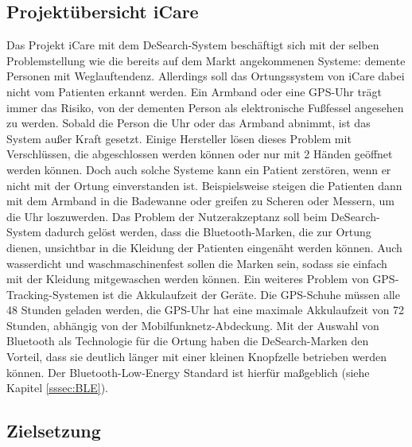 \subsection{Projektübersicht iCare}
Das Projekt iCare mit dem DeSearch-System beschäftigt sich mit der selben Problemstellung wie die bereits auf dem Markt angekommenen Systeme: demente Personen mit Weglauftendenz. Allerdings soll das Ortungssystem von iCare dabei nicht vom Patienten erkannt werden. Ein Armband oder eine GPS-Uhr trägt immer das Risiko, von der dementen Person als elektronische Fußfessel angesehen zu werden. Sobald die Person die Uhr oder das Armband abnimmt, ist das System außer Kraft gesetzt. Einige Hersteller lösen dieses Problem mit Verschlüssen, die abgeschlossen werden können oder nur mit 2 Händen geöffnet werden können. Doch auch solche Systeme kann ein Patient zerstören, wenn er nicht mit der Ortung einverstanden ist. Beispielsweise steigen die Patienten dann mit dem Armband in die Badewanne oder greifen zu Scheren oder Messern, um die Uhr loszuwerden. Das Problem der Nutzerakzeptanz soll beim DeSearch-System dadurch gelöst werden, dass die Bluetooth-Marken, die zur Ortung dienen, unsichtbar in die Kleidung der Patienten eingenäht werden können. Auch wasserdicht und waschmaschinenfest sollen die Marken sein, sodass sie einfach mit der Kleidung mitgewaschen werden können. Ein weiteres Problem von GPS-Tracking-Systemen ist die Akkulaufzeit der Geräte. Die GPS-Schuhe müssen alle 48 Stunden geladen werden, die GPS-Uhr hat eine maximale Akkulaufzeit von 72 Stunden, abhängig von der Mobilfunknetz-Abdeckung. Mit der Auswahl von Bluetooth als Technologie für die Ortung haben die DeSearch-Marken den Vorteil, dass sie deutlich länger mit einer kleinen Knopfzelle betrieben werden können. Der Bluetooth-Low-Energy Standard ist hierfür maßgeblich (siehe Kapitel \ref{sssec:BLE}).

\subsection{Zielsetzung}

